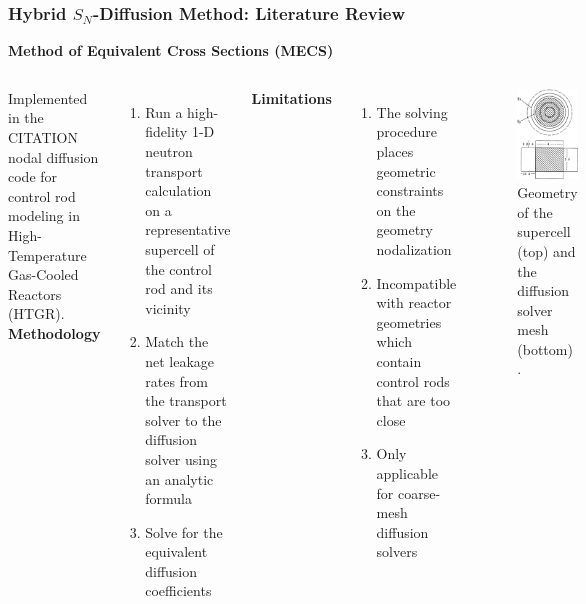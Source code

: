 \begin{frame}[noframenumbering]
  \frametitle{Hybrid $S_N$-Diffusion Method: Literature Review}
  \textbf{Method of Equivalent Cross Sections (MECS)}
  \begin{columns}
    \column[t]{7cm}
    Implemented in the CITATION nodal diffusion code for control rod modeling in High-Temperature
    Gas-Cooled Reactors (HTGR). \\
    \textbf{Methodology}
    \begin{enumerate}
      \item Run a high-fidelity 1-D neutron transport calculation on a representative supercell of
        the control rod and its vicinity
      \item Match the net leakage rates from the transport solver to the diffusion solver using an
        analytic formula
      \item Solve for the equivalent diffusion coefficients
    \end{enumerate}
    \textbf{Limitations}
    \begin{enumerate}
      \item The solving procedure places geometric constraints on the geometry nodalization
      \item Incompatible with reactor geometries which contain control rods that are too close
      \item Only applicable for coarse-mesh diffusion solvers
    \end{enumerate}
    \column[t]{4cm}
    \begin{figure}
      \centering
      \includegraphics[width=.75\columnwidth]{../images/mecs-geometry}
      \caption{Geometry of the supercell (top) and the diffusion solver mesh (bottom)
        \cite{fen_modelling_1992}.}
    \end{figure}
  \end{columns}
\end{frame}

